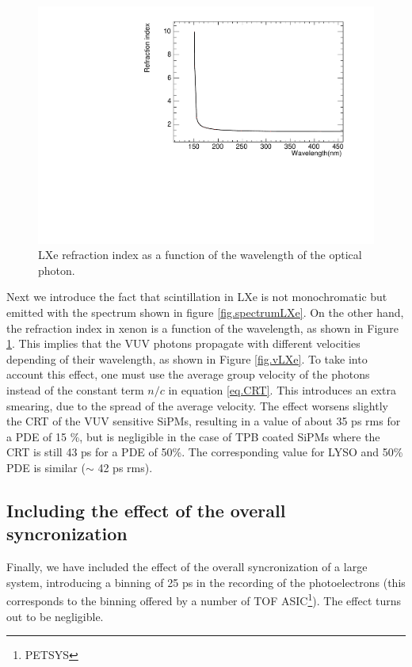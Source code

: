 \documentclass[review]{elsarticle}
\begin{document}
\begin{figure}[!bhtp]
	\centering
	\includegraphics[scale=0.5]{../img/LXe_n_lambda.pdf}
	\caption{\label{fig.nlambda} LXe refraction index as a function of the wavelength of the optical photon.}
\end{figure}

  Next we introduce the fact that scintillation in LXe is not monochromatic but emitted with the spectrum shown in figure \ref{fig.spectrumLXe}. On the other hand, the refraction index in xenon is a function of the wavelength, as shown in Figure \ref{fig.nlambda}. This implies that the VUV photons propagate with different velocities depending of their wavelength, as shown in Figure \ref{fig.vLXe}. To take into account this effect, one must use the average group velocity of the photons instead of the constant term $n/c$
in equation \ref{eq.CRT}. This introduces an extra smearing, due to the spread of the average velocity. The effect worsens slightly the CRT of the VUV sensitive SiPMs, resulting in a value of about 35 ps rms for a PDE of 15 \%, but is negligible in the case of TPB coated SiPMs where the CRT is still 43 ps for a PDE of 50\%. The corresponding value for LYSO and 50\% PDE is similar ($\sim$ 42 ps rms). 
  
  \subsection*{Including the effect of the overall syncronization}
  Finally, we have included the effect of the overall syncronization of a large system, introducing a binning of 25 ps in the recording of the photoelectrons (this corresponds to the binning offered by a number of TOF ASIC\footnote{PETSYS}). The effect turns out to be negligible.  
  
\end{document}

